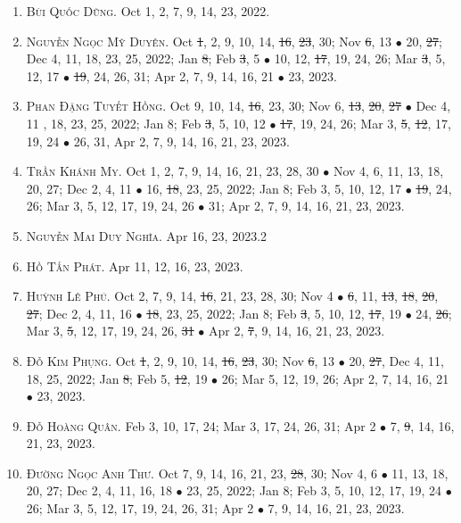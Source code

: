 \documentclass{article}
\begin{document}
\begin{enumerate}
	\item \textsc{Bùi Quốc Dũng.} {\sf[In]} Oct 1, 2, 7, 9, 14, 23, 2022. {\sf[Out]}
	\item \textsc{Nguyễn Ngọc Mỹ Duyên.} {\sf[In]} Oct \st{1}, 2, 9, 10, 14, \st{16}, \st{23}, 30; Nov \st{6}, 13 $\bullet$ 20, \st{27}; Dec 4, 11, 18, 23, 25, 2022; Jan \st{8}; Feb \st{3}, 5 $\bullet$ 10, 12, \st{17}, 19, 24, 26; Mar \st{3}, 5, 12, 17 $\bullet$ \st{19}, 24, 26, 31; Apr 2, 7, 9, 14, 16, 21 $\bullet$ 23, 2023.
	\item \textsc{Phan Đặng Tuyết Hồng.} {\sf[In]} Oct 9, 10, 14, \st{16}, 23, 30; Nov 6, \st{13}, \st{20}, \st{27} $\bullet$ Dec 4, 11 , 18, 23, 25, 2022; Jan 8; Feb \st{3}, 5, 10, 12 $\bullet$ \st{17}, 19, 24, 26; Mar 3, \st{5}, \st{12}, 17, 19, 24 $\bullet$ 26, 31, Apr 2, 7, 9, 14, 16, 21, 23, 2023.
	\item \textsc{Trần Khánh My.} {\sf[In]} Oct 1, 2, 7, 9, 14, 16, 21, 23, 28, 30 $\bullet$ Nov 4, 6, 11, 13, 18, 20, 27; Dec 2, 4, 11 $\bullet$ 16, \st{18}, 23, 25, 2022; Jan 8; Feb 3, 5, 10, 12, 17 $\bullet$ \st{19}, 24, 26; Mar 3, 5, 12, 17, 19, 24, 26 $\bullet$ 31; Apr 2, 7, 9, 14, 16, 21, 23, 2023.
	\item \textsc{Nguyễn Mai Duy Nghĩa.} {\sf[In]} Apr 16, 23, 2023.2
	\item \textsc{Hồ Tấn Phát.} {\sf[In]} Apr 11, 12, 16, 23, 2023.
	\item \textsc{Huỳnh Lê Phú.} {\sf[In]} Oct 2, 7, 9, 14, \st{16}, 21, 23, 28, 30; Nov 4 $\bullet$ \st{6}, 11, \st{13}, \st{18}, \st{20}, \st{27}; Dec 2, 4, 11, 16 $\bullet$ \st{18}, 23, 25, 2022; Jan 8; Feb \st{3}, 5, 10, 12, \st{17}, 19 $\bullet$ 24, \st{26}; Mar 3, \st{5}, 12, 17, 19, 24, 26, \st{31} $\bullet$ Apr 2, \st{7}, 9, 14, 16, 21, 23, 2023.
	\item \textsc{Đỗ Kim Phụng.} {\sf[In]} Oct \st{1}, 2, 9, 10, 14, \st{16}, \st{23}, 30; Nov \st{6}, 13 $\bullet$ 20, \st{27}, Dec 4, 11, 18, 25, 2022; Jan \st{8}; Feb 5, \st{12}, 19 $\bullet$ 26; Mar 5, 12, 19, 26; Apr 2, 7, 14, 16, 21 $\bullet$ 23, 2023.
	\item \textsc{Đỗ Hoàng Quân.} {\sf[In]} Feb 3, 10, 17, 24; Mar 3, 17, 24, 26, 31; Apr 2 $\bullet$ 7, \st{9}, 14, 16, 21, 23, 2023.
	\item \textsc{Đường Ngọc Anh Thư.} {\sf[In]} Oct 7, 9, 14, 16, 21, 23, \st{28}, 30; Nov 4, 6 $\bullet$ 11, 13, 18, 20, 27; Dec 2, 4, 11, 16, 18 $\bullet$ 23, 25, 2022; Jan 8; Feb 3, 5, 10, 12, 17, 19, 24 $\bullet$ 26; Mar 3, 5, 12, 17, 19, 24, 26, 31; Apr 2 $\bullet$ 7, 9, 14, 16, 21, 23, 2023.
\end{enumerate}
\end{document}
